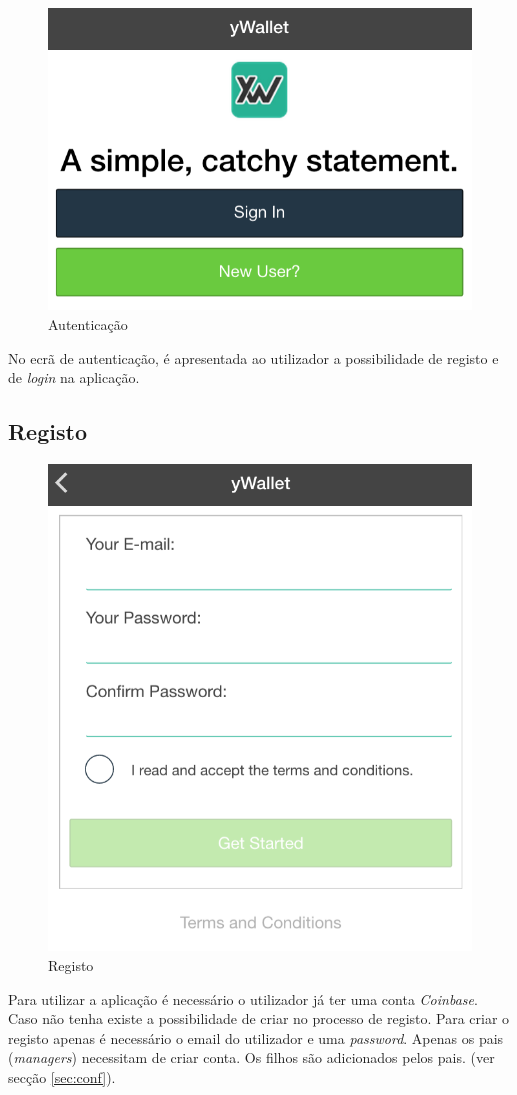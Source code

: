 \begin{figure}[H]
  \begin{center}
    \includegraphics[width=0.5
    \textwidth]{authentication/init.png}
  \end{center}
  \caption{Autenticação}
  \label{fig:1}
\end{figure}

No ecrã de autenticação, é apresentada ao utilizador a possibilidade de registo e de \textit{login} na aplicação.

\subsection{Registo}
  \begin{figure}[H]
    \begin{center}
      \includegraphics[width=0.5
      \textwidth]{authentication/register.png}
    \end{center}
    \caption{Registo}
    \label{fig:1_1}
  \end{figure}

Para utilizar a aplicação é necessário o utilizador já ter uma conta  \textit{Coinbase}. Caso não tenha existe a possibilidade de criar no processo de registo. Para criar o registo apenas é necessário o email do utilizador e uma \textit{password}. Apenas os pais (\textit{managers}) necessitam de criar conta. Os filhos são adicionados pelos pais. (ver secção \ref{sec:conf}).

